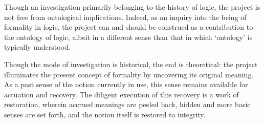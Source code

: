 \documentclass[]{article}
\begin{document}
Though an investigation primarily belonging to the history of logic, the project is not free from ontological implications. Indeed, as an inquiry into the being of formality in logic, the project can and should be construed as a contribution to the ontology of logic, albeit in a different sense than that in which `ontology' is typically understood.

Though the mode of investigation is historical, the end is theoretical: the project illuminates the present concept of formality by uncovering its original meaning. As a past sense of the notion currently in use, this sense remains available for actuation and recovery. The diligent execution of this recovery is a work of restoration, wherein accrued meanings are peeled back, hidden and more basic senses are set forth, and the notion itself is restored to integrity.
\end{document}
